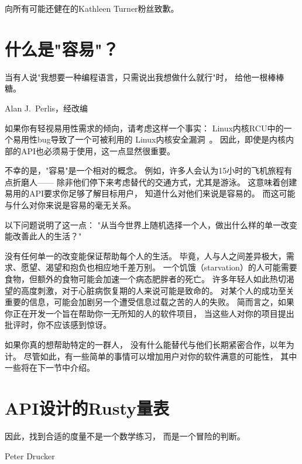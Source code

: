 
%
	 {向所有可能还健在的Kathleen Turner粉丝致歉。}

\section{什么是"容易"？}
\label{sec:easy:What is Easy?}
%
\epigraph{当有人说"我想要一种编程语言，只需说出我想做什么就行"时，
	  给他一根棒棒糖。}
	 {Alan J.~Perlis，经改编}

如果你有轻视易用性需求的倾向，请考虑这样一个事实：
Linux内核RCU中的一个易用性bug导致了一个可被利用的
Linux内核安全漏洞~\cite{McKenney:2019:CRS:3319647.3325836}。
因此，即使是内核内部的API也必须易于使用，这一点显然很重要。

不幸的是，"容易"是一个相对的概念。
例如，许多人会认为15小时的飞机旅程有点折磨人——
除非他们停下来考虑替代的交通方式，尤其是游泳。
这意味着创建易用的API要求你足够了解目标用户，
知道什么对他们来说是容易的。
而这可能与什么对你来说是容易的毫无关系。

以下问题说明了这一点：
"从当今世界上随机选择一个人，做出什么样的单一改变能改善此人的生活？"

没有任何单一的改变能保证帮助每个人的生活。
毕竟，人与人之间差异极大，需求、愿望、渴望和抱负也相应地千差万别。
一个饥饿（starvation）的人可能需要食物，但额外的食物可能会加速一个病态肥胖者的死亡。
许多年轻人如此热切渴望的高度刺激，对于心脏病恢复期的人来说可能是致命的。
对某个人的成功至关重要的信息，可能会加剧另一个遭受信息过载之苦的人的失败。
简而言之，如果你正在开发一个旨在帮助你一无所知的人的软件项目，
当这些人对你的项目提出批评时，你不应该感到惊讶。

如果你真的想帮助特定的一群人，
没有什么能替代与他们长期紧密合作，以年为计。
尽管如此，有一些简单的事情可以增加用户对你的软件满意的可能性，
其中一些将在下一节中介绍。

\section{API设计的Rusty量表}
\label{sec:easy:Rusty Scale for API Design}
%
\epigraph{因此，找到合适的度量不是一个数学练习，
	  而是一个冒险的判断。}
	 {Peter Drucker}

